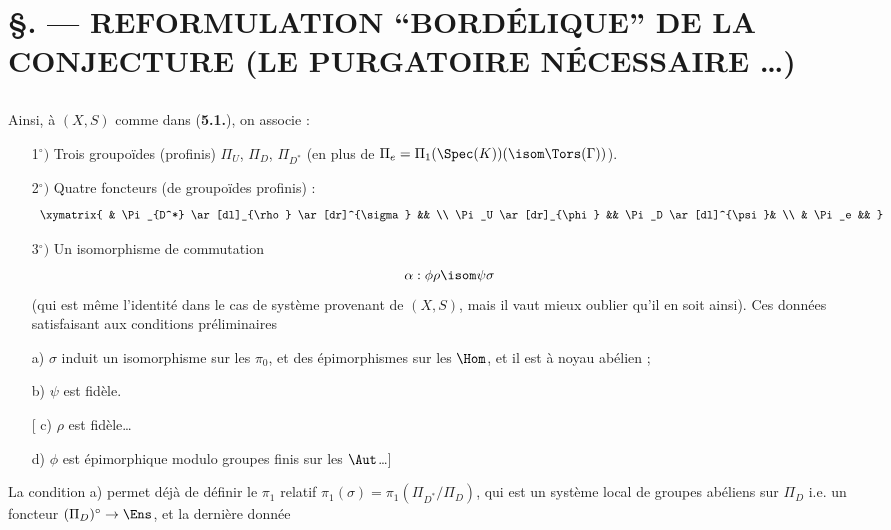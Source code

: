 \chapter*{\S {}. --- REFORMULATION ``BORDÉLIQUE'' DE LA CONJECTURE (LE PURGATOIRE NÉCESSAIRE \dots)}\thispagestyle{empty}
\label{sec:7}
\section*{}

Ainsi, à $(X, S)$ comme dans ({\bf 5.1.}), on associe :
\begin{enumerate}
    \item[1$^{\circ})$] Trois groupoïdes (profinis) $\Pi_U$, $\Pi_D$, $\Pi_{D^*}$ (en plus de $\Pi_e = \Pi_1(\Spec(K)) (\isom \Tors(\Gamma))$).
    \item[2$^{\circ})$] Quatre foncteurs (de groupoïdes profinis) :
    $$
    \begin{array}{c}
    \xymatrix{ & \Pi_{D^*} \ar[dl]_{\rho} \ar[dr]^{\sigma} && \\
    \Pi_U \ar[dr]_{\phi} && \Pi_D \ar[dl]^{\psi}& \\
    & \Pi_e && }
    \end{array}
    $$
    \item[3$^{\circ})$] Un isomorphisme de commutation 
    $$
    \alpha: \phi \rho \isom \psi \sigma
    $$
    (qui est même l'identité dans le cas de système provenant de $(X, S)$, mais il vaut mieux oublier qu'il en soit ainsi). Ces données satisfaisant aux conditions préliminaires
\end{enumerate}
\begin{enumerate}
    \item[a)] $\sigma$ induit un isomorphisme sur les $\pi_0$, et des épimorphismes sur les $\Hom$, et il est à noyau abélien ; 
    \item[b)] $\psi$ est fidèle.
    \item[[ c)] $\rho$ est fidèle\dots
    \item[d)] $\phi$ est épimorphique modulo groupes finis sur les $\Aut$\dots ]
\end{enumerate}
La condition a) permet déjà de définir le $\pi_1$ relatif $\pi_1(\sigma) = \pi_1(\Pi_{D^*}/\Pi_D)$, qui est un système local de groupes abéliens sur $\Pi_D$ i.e. un foncteur $(\Pi_D)^{\circ} \to \Ens$, et la dernière donnée
